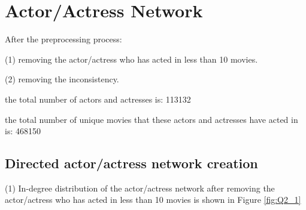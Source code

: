\documentclass[11pt]{article}
\begin{document}

\section{Actor/Actress Network}
After the preprocessing process:

(1) removing the actor/actress who has acted in less than 10 movies.

(2) removing the inconsistency.

the total number of actors and actresses is: 113132

the total number of unique movies that these actors and actresses have acted in is: 468150

\subsection{Directed actor/actress network creation}
(1) In-degree distribution of the actor/actress network after removing the actor/actress who has acted in less than 10 movies is shown in Figure \ref {fig:Q2_1}
\end{document}
